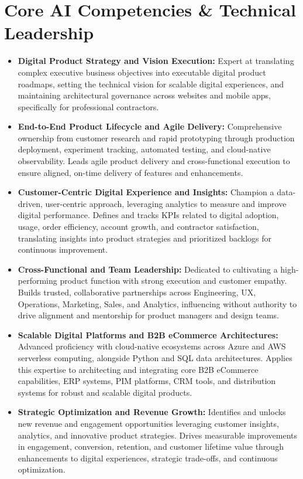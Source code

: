 \documentclass[9pt, letterpaper]{extarticle}
\begin{document}
\section{Core AI Competencies \& Technical Leadership}
\begin{itemize}
\item \textbf{Digital Product Strategy  and  Vision Execution:} Expert at translating complex executive business objectives into executable digital product roadmaps, setting the technical vision for scalable digital experiences, and maintaining architectural governance across websites and mobile apps, specifically for professional contractors.\item \textbf{End-to-End Product Lifecycle  and  Agile Delivery:} Comprehensive ownership from customer research and rapid prototyping through production deployment, experiment tracking, automated testing, and cloud-native observability. Leads agile product delivery and cross-functional execution to ensure aligned, on-time delivery of features and enhancements.\item \textbf{Customer-Centric Digital Experience  and  Insights:} Champion a data-driven, user-centric approach, leveraging analytics to measure and improve digital performance. Defines and tracks KPIs related to digital adoption, usage, order efficiency, account growth, and contractor satisfaction, translating insights into product strategies and prioritized backlogs for continuous improvement.\item \textbf{Cross-Functional  and  Team Leadership:} Dedicated to cultivating a high-performing product function with strong execution and customer empathy. Builds trusted, collaborative partnerships across Engineering, UX, Operations, Marketing, Sales, and Analytics, influencing without authority to drive alignment and mentorship for product managers and design teams.\item \textbf{Scalable Digital Platforms  and  B2B eCommerce Architectures:} Advanced proficiency with cloud-native ecosystems across Azure and AWS serverless computing, alongside Python and SQL data architectures. Applies this expertise to architecting and integrating core B2B eCommerce capabilities, ERP systems, PIM platforms, CRM tools, and distribution systems for robust and scalable digital products.\item \textbf{Strategic Optimization  and  Revenue Growth:} Identifies and unlocks new revenue and engagement opportunities leveraging customer insights, analytics, and innovative product strategies. Drives measurable improvements in engagement, conversion, retention, and customer lifetime value through enhancements to digital experiences, strategic trade-offs, and continuous optimization.
\end{itemize}
\end{document}
